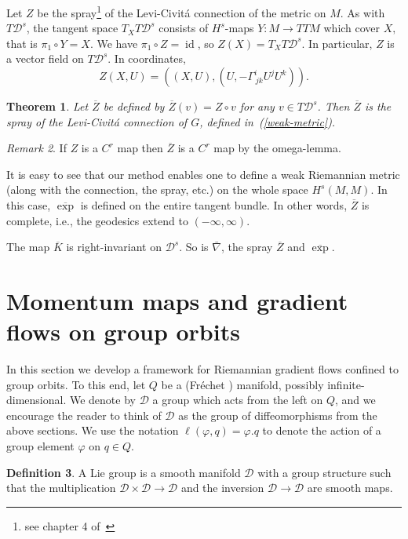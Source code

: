 \documentclass[a5paper,10pt,twoside]{article}
\newcommand{\cD}{\ensuremath{\mathcal{D}}}
\DeclareMathOperator*{\id}{id}
\theoremstyle{plain}
\newtheorem{teo}{Theorem}[section]
\theoremstyle{definition}
\newtheorem{defn}[teo]{Definition}
\theoremstyle{remark}
\newtheorem{rem}[teo]{Remark}
\begin{document}
Let $Z$ be the spray\footnote{see chapter 4 of~\cite{lang1999}} of the Levi-Civitá connection of the metric on $M$. As with $T\cD^s$, the tangent space $T_XT\cD^s$ consists of $H^s$-maps $Y:M\to TTM$ which cover $X,$ that is $\pi_1\circ Y=X$. We have $\pi_1\circ Z=\id$, so $Z(X)=T_XT\cD^s.$ In particular, $Z$ is a vector field on $T\cD^s.$ In coordinates,
%
\begin{equation}
Z(X,U)=\left((X,U),\left(U,-\Gamma^i_{\,jk}U^jU^k\right)\right).
\end{equation}

\begin{teo}
Let $\overline{Z}$ be defined by $\overline{Z}(v)=Z\circ v$ for any $v\in T\cD^s$. Then $\overline{Z}$ is the spray of the Levi-Civitá connection of $G$, defined in~(\ref{weak-metric}).
\end{teo}

\begin{rem} 
If $Z$ is a $C^r$ map then $\overline{Z}$ is a $C^r$ map by the omega-lemma.
\end{rem}

It is easy to see that our method enables one to define a weak
Riemannian metric (along with the connection, the spray, etc.) on the whole
space $H^s(M, M)$. In this case, $\overline{\exp}$ is defined on the entire tangent bundle. In other words, $\overline{Z}$ is complete, i.e., the geodesics extend to $(-\infty,\infty)$.

The map $\overline{K}$ is right-invariant on $\cD^s$. So is $\bar{\nabla}$, the spray $\overline{Z}$ and $\overline{\exp}$.


\section{Momentum maps and gradient flows on group orbits}
In this section we develop a framework for Riemannian gradient flows confined
to group orbits. To this end, let $Q$ be a (Fréchet \cite{hamilton1982inverse}) manifold, possibly infinite-dimensional.
We denote by $\cD$ a group which acts from the left on $Q$, and we encourage the reader to think of $\cD$ as the group of diffeomorphisms from the above sections. We use the notation $\ell(\varphi,q)=\varphi.q$ to denote the action of a group element $\varphi$ on $q\in Q$.

\begin{defn}
A Lie group is a smooth manifold $\cD$ with a group structure
such that the multiplication $\cD\times\cD\to \cD$ and the inversion $\cD\to\cD$ are smooth maps.
\end{defn}
\end{document}
